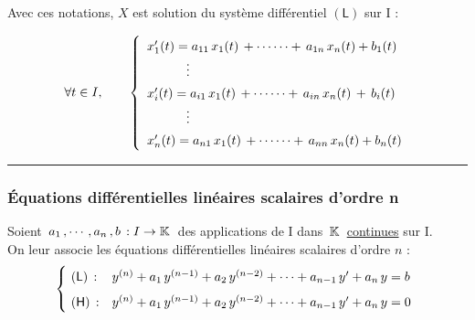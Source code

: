 \vspace{1cm}

Avec ces notations, $X$ est solution du système différentiel $(\mathsf{L})$ sur I \ssi :

\[\forall t\in I, \qquad \left\{\def\arraystretch{1.4}
\begin{array}{l}
    x'_1(t)=a_{11}\,x_1(t)\,+\cdots\cdots+\,a_{1n}\,x_n(t)+b_1(t)\\
    \hspace{1.08cm} \vdots\\
    x'_i(t)=a_{i1}\,x_1(t)\,+\cdots\cdots+\,a_{in}\,x_n(t)\,+\,b_i(t)\\
    \hspace{1.08cm} \vdots\\
    x'_n(t)=a_{n1}\,x_1(t)\,+\cdots\cdots+\,a_{nn}\,x_n(t)+b_n(t)
\end{array}
\right.\]

\vspace{1cm}

\hrule

\vspace{1.5cm}

\subsubsection[EDL scalaire d'ordre n]{Équations différentielles linéaires scalaires d'ordre n}

\vspace{0.7cm}

Soient \(\,a_1\,,\cdots,a_n\,,b\,:I\to \mathbb{K}\: \) des applications de I dans \(\,\mathbb{K}\,\) \underline{continues} sur I.\vspace{0.1cm}\\
On leur associe les équations différentielles linéaires scalaires d'ordre $n$ :
\[\left\{\!
\begin{array}{ll}
    (\mathsf{L})\,: & y^{(n)}+a_1\,y^{(n-1)}+a_2\,y^{(n-2)}+\cdots+a_{n-1}\,y'+a_n\,y=b\vspace{0.1cm}\\
    (\mathsf{H})\,: & y^{(n)}+a_1\,y^{(n-1)}+a_2\,y^{(n-2)}+\cdots+a_{n-1}\,y'+a_n\,y=0
\end{array}
 \right.\]\vspace{0.3cm}

